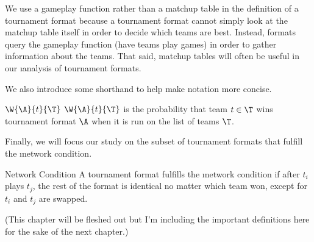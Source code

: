 {We use a gameplay function rather than a matchup table in the definition of a tournament format because a tournament format cannot simply look at the matchup table itself in order to decide which teams are best. Instead, formats query the gameplay function (have teams play games) in order to gather information about the teams. That said, matchup tables will often be useful in our \i{analysis} of tournament formats. 

We also introduce some shorthand to help make notation more concise.

\begin{definition}{$\W{\A}{t}{\T}$}{}
    $\W{\A}{t}{\T}$ is the probability that team $t \in \T$ wins tournament format $\A$ when it is run on the list of teams $\T$.
\end{definition}



Finally, we will focus our study on the subset of tournament formats that fulfill the \i{network condition}.

\begin{definition}{Network Condition}{}
    A tournament format fulfills the \i{network condition} if after $t_i$ plays $t_j$, the rest of the format is identical no matter which team won, except for $t_i$ and $t_j$ are swapped.
\end{definition}

(This chapter will be fleshed out but I'm including the important definitions here for the sake of the next chapter.)
}







